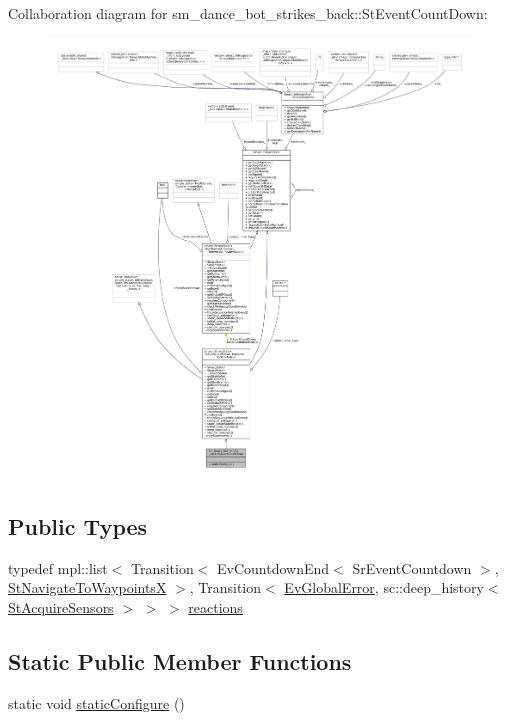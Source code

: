 Collaboration diagram for sm\+\_\+dance\+\_\+bot\+\_\+strikes\+\_\+back\+:\+:St\+Event\+Count\+Down\+:
\nopagebreak
\begin{figure}[H]
\begin{center}
\leavevmode
\includegraphics[width=350pt]{structsm__dance__bot__strikes__back_1_1StEventCountDown__coll__graph}
\end{center}
\end{figure}
\subsection*{Public Types}
\begin{DoxyCompactItemize}
\item 
typedef mpl\+::list$<$ Transition$<$ Ev\+Countdown\+End$<$ Sr\+Event\+Countdown $>$, \hyperlink{structsm__dance__bot__strikes__back_1_1StNavigateToWaypointsX}{St\+Navigate\+To\+WaypointsX} $>$, Transition$<$ \hyperlink{structsm__dance__bot__strikes__back_1_1EvGlobalError}{Ev\+Global\+Error}, sc\+::deep\+\_\+history$<$ \hyperlink{structsm__dance__bot__strikes__back_1_1StAcquireSensors}{St\+Acquire\+Sensors} $>$ $>$ $>$ \hyperlink{structsm__dance__bot__strikes__back_1_1StEventCountDown_a727d864e6d375449a51fd8ea47810551}{reactions}
\end{DoxyCompactItemize}
\subsection*{Static Public Member Functions}
\begin{DoxyCompactItemize}
\item 
static void \hyperlink{structsm__dance__bot__strikes__back_1_1StEventCountDown_a2b0d518bcc72065392d547d69c0dff7d}{static\+Configure} ()
\end{DoxyCompactItemize}
